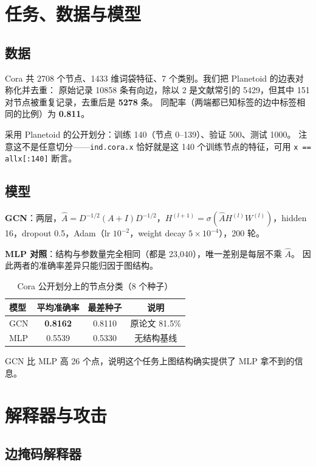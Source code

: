 \documentclass[a4paper,10pt]{article}
\begin{document}
\section{任务、数据与模型}\label{sec:setup}

\subsection{数据}

Cora 共 2708 个节点、1433 维词袋特征、7 个类别。我们把 Planetoid 的边表对称化并去重：
原始记录 10858 条有向边，除以 2 是文献常引的 5429，但其中 151 对节点被重复记录，去重后是 \textbf{5278} 条。
同配率（两端都已知标签的边中标签相同的比例）为 \textbf{0.811}。

采用 Planetoid 的公开划分：训练 140（节点 0--139）、验证 500、测试 1000。
注意这不是任意切分——\texttt{ind.cora.x} 恰好就是这 140 个训练节点的特征，可用 \texttt{x == allx[:140]} 断言。

\subsection{模型}

\textbf{GCN}：两层，$\hat A=D^{-1/2}(A+I)D^{-1/2}$，$H^{(l+1)}=\sigma(\hat A H^{(l)}W^{(l)})$，hidden 16，dropout 0.5，Adam（lr $10^{-2}$，weight decay $5\times10^{-4}$），200 轮。

\textbf{MLP 对照}：结构与参数量完全相同（都是 23{,}040），唯一差别是每层不乘 $\hat A$。
因此两者的准确率差异只能归因于图结构。

\begin{table}[H]
\centering
\caption{Cora 公开划分上的节点分类（8 个种子）}
\label{tab:acc}
\begin{tabular}{lccc}
\toprule
模型 & 平均准确率 & 最差种子 & 说明 \\
\midrule
GCN & \textbf{0.8162} & 0.8110 & 原论文 81.5\% \\
MLP & 0.5539 & 0.5330 & 无结构基线 \\
\bottomrule
\end{tabular}
\end{table}

GCN 比 MLP 高 26 个点，说明这个任务上图结构确实提供了 MLP 拿不到的信息。

\section{解释器与攻击}\label{sec:method}

\subsection{边掩码解释器}
\end{document}
